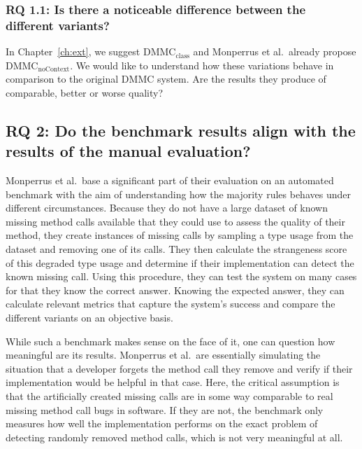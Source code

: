 \subsubsection{RQ 1.1: Is there a noticeable difference between the different variants?}

In Chapter~\ref{ch:ext}, we suggest $\text{DMMC}_\text{class}$ and Monperrus et al.\ already propose $\text{DMMC}_\text{noContext}$.
We would like to understand how these variations behave in comparison to the original $\text{DMMC}$ system.
Are the results they produce of comparable, better or worse quality?

\subsection*{RQ 2: Do the benchmark results align with the results of the manual evaluation?}

Monperrus et al.\ base a significant part of their evaluation on an automated benchmark with the aim of understanding how the majority rules behaves under different circumstances.
Because they do not have a large dataset of known missing method calls available that they could use to assess the quality of their method, they create instances of missing calls by sampling a type usage from the dataset and removing one of its calls.
They then calculate the strangeness score of this degraded type usage and determine if their implementation can detect the known missing call.
Using this procedure, they can test the system on many cases for that they know the correct answer.
Knowing the expected answer, they can calculate relevant metrics that capture the system's success and compare the different variants on an objective basis.

While such a benchmark makes sense on the face of it, one can question how meaningful are its results.
Monperrus et al.\ are essentially simulating the situation that a developer forgets the method call they remove and verify if their implementation would be helpful in that case.
Here, the critical assumption is that the artificially created missing calls are in some way comparable to real missing method call bugs in software.
If they are not, the benchmark only measures how well the implementation performs on the exact problem of detecting randomly removed method calls, which is not very meaningful at all.

